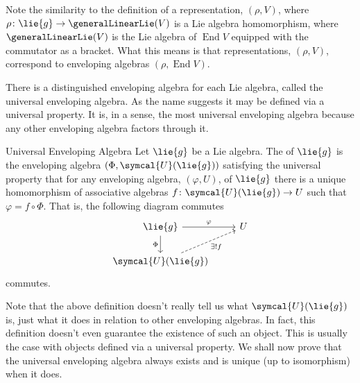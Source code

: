 \documentclass[fleqn]{NotesClass}
\DeclareMathOperator{\End}{End}
\newcommand{\universalenveloping}{\symcal{U}}
\begin{document}
    Note the similarity to the definition of a representation, \((\rho, V)\), where \(\rho \colon \lie{g} \to \generalLinearLie(V)\) is a Lie algebra homomorphism, where \(\generalLinearLie(V)\) is the Lie algebra of \(\End V\) equipped with the commutator as a bracket.
    What this means is that representations, \((\rho, V)\), correspond to enveloping algebras \((\rho, \End V)\).
    
    There is a distinguished enveloping algebra for each Lie algebra, called the universal enveloping algebra.
    As the name suggests it may be defined via a universal property.
    It is, in a sense, the most universal enveloping algebra because any other enveloping algebra factors through it.
    
    \begin{dfn}{Universal Enveloping Algebra}{}
        Let \(\lie{g}\) be a Lie algebra.
        The  of \(\lie{g}\) is the enveloping algebra \((\Phi, \universalenveloping(\lie{g}))\) satisfying the universal property that for any enveloping algebra, \((\varphi, U)\), of \(\lie{g}\) there is a unique homomorphism of associative algebras \(f \colon \universalenveloping(\lie{g}) \to U\) such that \(\varphi = f \circ \Phi\).
        That is, the following diagram commutes
        \begin{equation}
            \begin{tikzcd}
                \lie{g} \arrow[r, "\varphi"] \arrow[d, "\Phi"'] & U\\
                \universalenveloping(\lie{g}) \arrow[ur, dashed, "\exists! f"']
            \end{tikzcd}
        \end{equation}
        commutes.
    \end{dfn}
    
    Note that the above definition doesn't really tell us what \(\universalenveloping(\lie{g})\) is, just what it does in relation to other enveloping algebras.
    In fact, this definition doesn't even guarantee the existence of such an object.
    This is usually the case with objects defined via a universal property.
    We shall now prove that the universal enveloping algebra always exists and is unique (up to isomorphism) when it does.
    
\end{document}
